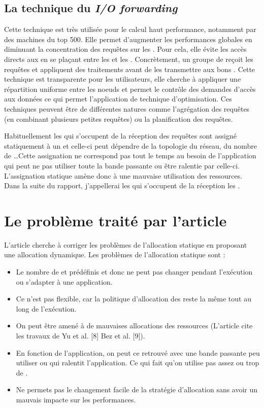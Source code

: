 \documentclass[10pt, a4paper]{article}
\begin{document}
\subsection{La technique du \emph{I/O forwarding}}

Cette technique est très utilisée pour le calcul haut performance, notamment par des machines du top 500\cite{}. Elle permet d'augmenter les performances globales en diminuant la concentration des requêtes sur les \noeudsIO{}. Pour cela, elle évite les accès directs aux \noeudsIO{} en se plaçant entre les \noeudsDeCalculs{} et les \noeudsIO{}. Concrètement, un groupe de \noeudsIO{} reçoit les requêtes et appliquent des traitements avant de les transmettre aux bons \noeudsIO{}. Cette technique est transparente pour les utilisateurs, elle cherche à appliquer une répartition uniforme entre les noeuds et permet le contrôle des demandes d'accès aux données ce qui permet l'application de technique d'optimisation. Ces techniques peuvent être de différentes natures comme l'agrégation des requêtes (en combinant plusieurs petites requêtes) ou la planification des requêtes.

Habituellement les \noeudsIO{} qui s'occupent de la réception des requêtes sont assigné statiquement à un \noeudDeCalculs{} et celle-ci peut dépendre de la topologie du réseau, du nombre de \noeudsIO{}\dots Cette assignation ne correspond pas tout le temps au besoin de l'application qui peut ne pas utiliser toute la bande passante ou être ralentie par celle-ci. L'assignation statique amène donc à une mauvaise utilisation des ressources. Dans la suite du rapport, j'appellerai les \noeudsIO{} qui s'occupent de la réception les \noeudsIOforwarding{}.

\section{Le problème traité par l'article}

L'article cherche à corriger les problèmes de l'allocation statique en proposant une allocation dynamique.
Les problèmes de l'allocation statique sont :
\begin{itemize}
  \item Le nombre de \noeudsIO{} et prédéfinis et donc ne peut pas changer pendant l'exécution ou s'adapter à une application.
  \item Ce n'est pas flexible, car la politique d'allocation des \noeudsIO{} reste la même tout au long de l'exécution.
  \item On peut être amené à de mauvaises allocations des ressources (L'article cite les travaux de Yu et al. [8] Bez et al. [9])\cite{}.
  \item En fonction de l'application, on peut ce retrouvé avec une bande passante peu utiliser ou qui ralentit l'application. Ce qui fait qu'on utilise pas assez ou trop de \noeudsIO{}.
  \item Ne permets pas le changement facile de la stratégie d'allocation sans avoir un mauvais impacte sur les performances.
\end{itemize}
\end{document}
